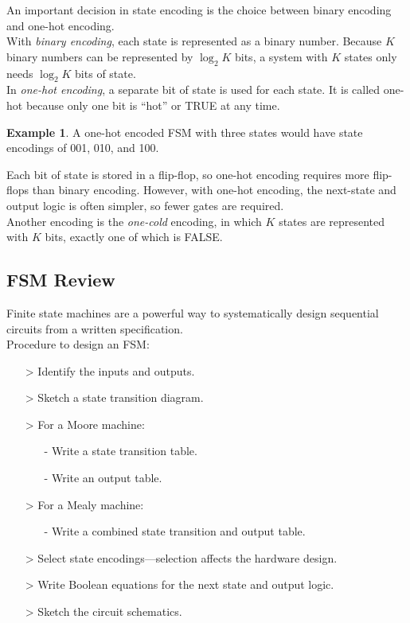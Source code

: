 \documentclass[12pt]{article}
\theoremstyle{definition}
\newtheorem{ex}{Example}[section]
\begin{document}
  An important decision in state encoding is the choice between binary encoding and one-hot encoding. \\
  With \emph{binary encoding}, each state is represented as a binary number.
  Because $K$ binary numbers can be represented by $\log_{2}K$ bits, a system with $K$ states only needs $\log_{2}K$ bits of state. \\

  In \emph{one-hot encoding},  a separate bit of state is used for each state.
  It is called one-hot because only one bit is ``hot'' or TRUE at any time.
  \begin{ex}
    A one-hot encoded FSM with three states would have state encodings of 001, 010, and 100.
  \end{ex}
  Each bit of state is stored in a flip-flop, so one-hot encoding requires more flip-flops than binary encoding.
  However, with one-hot encoding, the next-state and output logic is often simpler, so fewer gates are required. \\

  Another encoding is the \emph{one-cold} encoding, in which $K$ states are represented with $K$ bits, exactly one of which is FALSE.

  \subsection{FSM Review} \label{FSM_Review}
  Finite state machines are a powerful way to systematically design sequential circuits from a written specification. \\
  Procedure to design an FSM:
  \begin{enumerate}
    \item[>] Identify the inputs and outputs.
    \item[>] Sketch a state transition diagram.
    \item[>] For a Moore machine:
    \begin{enumerate}
      \item[-] Write a state transition table.
      \item[-] Write an output table.
    \end{enumerate}
    \item[>] For a Mealy machine:
    \begin{enumerate}
      \item[-] Write a combined state transition and output table.
    \end{enumerate}
    \item[>] Select state encodings---selection affects the hardware design.
    \item[>] Write Boolean equations for the next state and output logic.
    \item[>] Sketch the circuit schematics.
  \end{enumerate}
\end{document}

